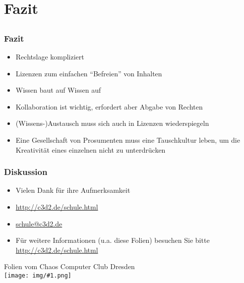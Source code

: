 \documentclass[table]{beamer}
\newcommand{\cc}[1]{\texttt{[image: img/\#1.png]}}
\begin{document}
\section{Fazit}
\subsection{}

\begin{frame}
    \frametitle{Fazit}
    \begin{itemize}
      \item Rechtslage kompliziert
      \item Lizenzen zum einfachen ``Befreien'' von Inhalten
      \item Wissen baut auf Wissen auf
      \item Kollaboration ist wichtig, erfordert aber Abgabe von Rechten
      \item (Wissens-)Austausch muss sich auch in Lizenzen wiederspiegeln
      \item Eine Gesellschaft von Prosumenten muss eine Tauschkultur leben, um die Kreativität eines einzelnen nicht zu unterdrücken
    \end{itemize}
\end{frame}

\begin{frame}
    \frametitle{Diskussion}
    \begin{itemize}
        \item Vielen Dank für ihre Aufmerksamkeit
        \item \url{http://c3d2.de/schule.html}
        \item \url{schule@c3d2.de}
        \item Für weitere Informationen (u.a. diese Folien) besuchen Sie bitte \url{http://c3d2.de/schule.html}
    \end{itemize}
    \begin{center}
   Folien vom Chaos Computer Club Dresden\\
   {\cc{by-sa}}
   \end{center}
\end{frame}
\end{document}
